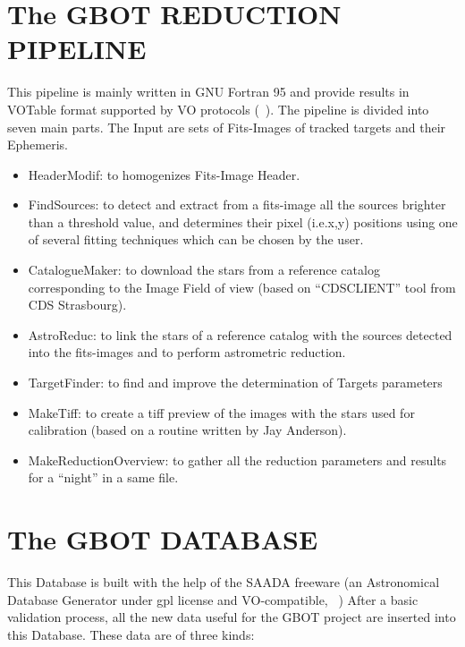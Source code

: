 \documentclass[11pt,twoside]{article}
\begin{document}
\section{The GBOT REDUCTION PIPELINE }
This pipeline is mainly written in GNU Fortran 95 and provide results in VOTable format supported by VO protocols (~\cite{Bouquillon_2012}).
The pipeline is divided into seven main parts.
The Input are sets of Fits-Images of tracked targets and their Ephemeris.
\begin{itemize}
\item HeaderModif: to homogenizes Fits-Image Header.                               
\item FindSources: to detect and extract from a fits-image
all the sources brighter than a threshold value, and determines 
their pixel (i.e.x,y) positions using one of several fitting 
techniques which can be chosen by the user.                               
\item CatalogueMaker: to download the stars from a       
reference catalog corresponding to the Image Field of view
(based on “CDSCLIENT” tool from CDS Strasbourg).                              
\item AstroReduc: to link the stars of a reference catalog  
with the sources detected into the fits-images and to perform 
astrometric reduction.                             
\item TargetFinder: to find and improve the determination 
of Targets parameters
\item MakeTiff: to create a tiff preview of the images with
the stars used for calibration (based on a routine written by Jay Anderson).                      
\item MakeReductionOverview: to gather all the       
reduction parameters and results for a “night” in a same file.
\end{itemize}


\section{The GBOT DATABASE}
This Database is built with the help of the SAADA freeware (an Astronomical Database Generator under gpl license and VO‑compatible, ~\cite{Michel_2011})
After a basic validation process, all the new data useful for the GBOT project are inserted into this Database. These data are of three kinds:
\end{document}
